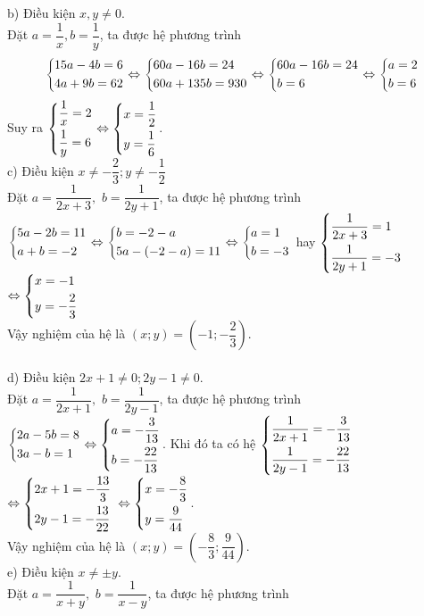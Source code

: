 \begin{ex}
{  b) Điều kiện $x,y \ne 0$.\\
Đặt $a=\dfrac{1}{x}, b=\dfrac{1}{y}$, ta  được hệ phương trình
$$
\left\{\begin{aligned}& 15a- 4b=6 \\ & 4a+9b=62\end{aligned}\right. \Leftrightarrow \left\{\begin{aligned}& 60a- 16b=24\\ & 60a +135b =930\end{aligned}\right. \Leftrightarrow \left\{\begin{aligned}& 60a- 16b=24\\ &  b=6\end{aligned}\right.\Leftrightarrow \left\{\begin{aligned}& a=2\\ & b= 6\end{aligned}\right.$$
Suy ra  $\left\{\begin{aligned}& \dfrac{1}{x}=2\\ & \dfrac{1}{y}=6\end{aligned}\right.\Leftrightarrow \left\{\begin{aligned}& x=\dfrac{1}{2}\\ & y=\dfrac{1}{6}\end{aligned}\right.$.\\     
    c) Điều kiện $x\ne -\dfrac{2}{3}; y\ne -\dfrac{1}{2}$\\
Đặt $a=\dfrac{1}{2x+3},$ $b=\dfrac{1}{2y+1}$, ta  được hệ phương trình\\
$\left\{\begin{aligned}& 5a-2b=11\\ & a+b=-2\end{aligned}\right. \Leftrightarrow \left\{\begin{aligned}& b=-2-a\\ & 5a-(-2-a) =11\end{aligned}\right. \Leftrightarrow \left\{\begin{aligned}  & a=1\\ & b=-3\end{aligned}\right.$  hay $\left\{\begin{aligned}& \dfrac{1}{2x+3}=1\\ & \dfrac{1}{2y+1}=-3\end{aligned}\right. $ $\Leftrightarrow  \left\{\begin{aligned}& x=-1\\& y=-\dfrac{2}{3}\end{aligned}\right.$\\
Vậy nghiệm của  hệ là $(x;y)=\left(-1;-\dfrac{2}{3}\right)$.\\   
   \\
       d) Điều kiện $2x+1\ne 0; 2y-1\ne 0$. \\
   Đặt $a=\dfrac{1}{2x+1},$ $b=\dfrac{1}{2y-1}$, ta  được hệ phương trình\\
$\left\{\begin{aligned}&2a-5b=8\\ &  3a-b=1\end{aligned}\right.\Leftrightarrow \left\{\begin{aligned}&  a=-\dfrac{3}{13}\\ & b=-\dfrac{22}{13}\end{aligned}\right.$. Khi đó ta  có  hệ $\left\{\begin{aligned}& \dfrac{1}{2x+1}=-\dfrac{3}{13}\\ & \dfrac{1}{2y-1}=-\dfrac{22}{13}\end{aligned}\right.$ $\Leftrightarrow \left\{\begin{aligned}& 2x+1=-\dfrac{13}{3} \\ & 2y-1=-\dfrac{13}{22}\end{aligned}\right.$ $\Leftrightarrow \left\{\begin{aligned}& x=-\dfrac{8}{3}\\ & y=\dfrac{9}{44}\end{aligned}\right.$.\\
Vậy nghiệm của  hệ là $(x;y)=\left(-\dfrac{8}{3};\dfrac{9}{44}\right)$.\\ 
   e) Điều kiện $x\ne \pm y$. \\
   Đặt $a=\dfrac{1}{x+y},$ $b=\dfrac{1}{x-y}$, ta  được hệ phương trình\\
}
\end{ex}
